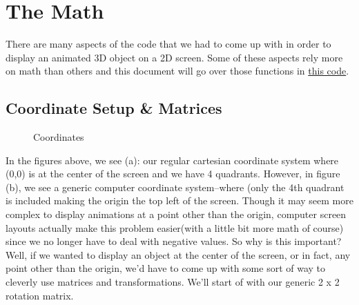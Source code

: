\documentclass[14pt]{article}
\begin{document}
\newpage

\section*{The Math}

There are many aspects of the code that we had to come up with in order to display an animated 3D object on a 2D screen. Some of these aspects rely more on math than others and this document will go over those functions in \textcolor{blue}{\href{https://github.com/itsmehere/SpinningCube/blob/main/cubeProj.py}{this code}}.

\subsection*{Coordinate Setup \& Matrices}

\begin{figure}[!htb]
    \centering
    \qquad
    \caption{Coordinates}%
    \label{fig:example}%
\end{figure}

In the figures above, we see (a): our regular cartesian coordinate system where (0,0) is at the center of the screen and we have 4 quadrants. However, in figure (b), we see a generic computer coordinate system--where (only the 4th quadrant is included making the origin the top left of the screen. Though it may seem more complex to display animations at a point other than the origin, computer screen layouts actually make this problem easier(with a little bit more math of course) since we no longer have to deal with negative values. So why is this important? Well, if we wanted to display an object at the center of the screen, or in fact, any point other than the origin, we'd have to come up with some sort of way to cleverly use matrices and transformations. We'll start of with our generic 2 x 2 rotation matrix.
\end{document}
